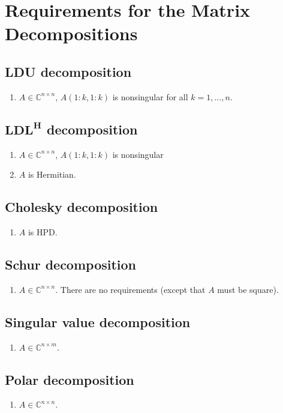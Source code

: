 \documentclass[a4paper, landscape,twocolumn,fontsize=9pt]{scrartcl}
\begin{document}
\section*{Requirements for the Matrix Decompositions}
\subsection*{LDU decomposition}
\begin{enumerate}
	\item $A \in \mathbb C^{n \times n}$, $A(1:k,1:k)$ is nonsingular for all $k = 1,...,n$.
\end{enumerate}

\subsection*{$\mathbf{LDL^H}$ decomposition}
\begin{enumerate}
	\item $A \in \mathbb C^{n \times n}$, $A(1:k,1:k)$ is nonsingular
	\item $A$ is Hermitian.
\end{enumerate}

\subsection*{Cholesky decomposition}
\begin{enumerate}
	\item $A$ is HPD.
\end{enumerate}

\subsection*{Schur decomposition}
\begin{enumerate}
	\item $A \in \mathbb C^{n \times n}$. There are no requirements (except that $A$ must be square).
\end{enumerate}

\subsection*{Singular value decomposition}
\begin{enumerate}
	\item $A \in \mathbb C^{n \times m}$.
\end{enumerate}

\subsection*{Polar decomposition}
\begin{enumerate}
	\item $A \in \mathbb C^{n \times n}$.
\end{enumerate}
\end{document}
